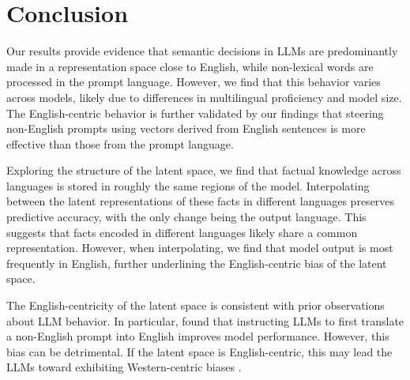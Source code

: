 \section{Conclusion}

Our results provide evidence that semantic decisions in LLMs are predominantly made in a representation space close to English, while non-lexical words are processed in the prompt language. 
However, we find that this behavior varies across models, likely due to differences in multilingual proficiency and model size. 
The English-centric behavior is further validated by our findings that steering non-English prompts using vectors derived from English sentences is more effective than those from the prompt language.

Exploring the structure of the latent space, we find that factual knowledge across languages is stored in roughly the same regions of the model. 
Interpolating between the latent representations of these facts in different languages preserves predictive accuracy, with the only change being the output language. 
This suggests that facts encoded in different languages likely share a common representation. 
However, when interpolating, we find that model output is most frequently in English, further underlining the English-centric bias of the latent space. 


The English-centricity of the latent space is consistent with prior observations about LLM behavior. 
In particular, \citet{etxaniz2023multilinguallanguagemodelsthink} found that instructing LLMs to first translate a non-English prompt into English improves model performance. 
However, this bias can be detrimental. If the latent space is English-centric, this may lead the LLMs toward exhibiting Western-centric biases \citep{naous2024havingbeerprayermeasuring, shafayat2024multifactassessingfactualitymultilingual}. 